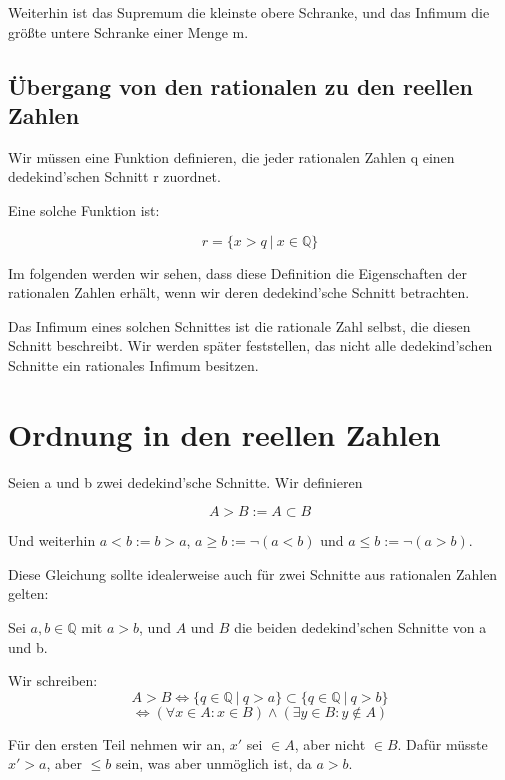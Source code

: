 \documentclass[12pt]{article}
\begin{document}
    Weiterhin ist das Supremum die kleinste obere Schranke, und das Infimum die größte untere Schranke einer Menge m.

    \newpage

    \subsection{Übergang von den rationalen zu den reellen Zahlen}

    Wir müssen eine Funktion definieren, die jeder rationalen Zahlen q einen dedekind'schen Schnitt r zuordnet.

    Eine solche Funktion ist:

    \[r = \{x > q \mspace{4mu} | \mspace{4mu} x \in \mathbb{Q}\}\]

    Im folgenden werden wir sehen, dass diese Definition die Eigenschaften der rationalen Zahlen erhält, wenn
    wir deren dedekind'sche Schnitt betrachten.

    Das Infimum eines solchen Schnittes ist die rationale Zahl selbst, die diesen Schnitt beschreibt.
    Wir werden später feststellen, das nicht alle dedekind'schen Schnitte ein rationales Infimum besitzen.

    \section{Ordnung in den reellen Zahlen}

    Seien a und b zwei dedekind'sche Schnitte. Wir definieren

    \[A > B := A \subset B\]

    Und weiterhin $a < b := b > a$, $a \ge b := \lnot (a < b)$ und $a \le b := \lnot (a > b)$.

    Diese Gleichung sollte idealerweise auch für zwei Schnitte aus rationalen Zahlen gelten:

    Sei $a, b \in \mathbb{Q}$ mit $a > b$, und $A$ und $B$ die beiden dedekind'schen Schnitte von a und b.

    Wir schreiben:
    \[
        A > B \Leftrightarrow \{q \in \mathbb{Q} \mspace{4mu} | \mspace{4mu} q > a\} \subset
        \{q \in \mathbb{Q} \mspace{4mu} | \mspace{4mu} q > b\}
    \]
    \[
        \Leftrightarrow (\forall x \in A: x \in B) \land (\exists y \in B: y \not \in A)
    \]

    Für den ersten Teil nehmen wir an, $x'$ sei $\in A$, aber nicht $\in B$.
    Dafür müsste $x' > a$, aber $\le b$ sein, was aber unmöglich ist, da $a > b$.
\end{document}
